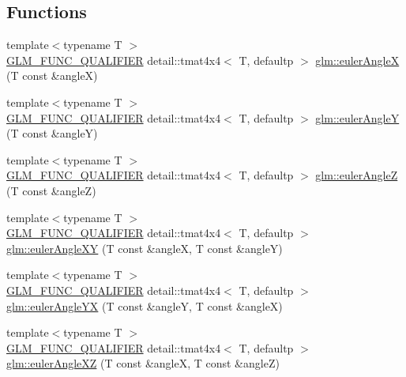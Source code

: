 \subsection*{Functions}
\begin{DoxyCompactItemize}
\item 
{\footnotesize template$<$typename T $>$ }\\\hyperlink{setup_8hpp_a33fdea6f91c5f834105f7415e2a64407}{G\+L\+M\+\_\+\+F\+U\+N\+C\+\_\+\+Q\+U\+A\+L\+I\+F\+I\+ER} detail\+::tmat4x4$<$ T, defaultp $>$ \hyperlink{group__gtx__euler__angles_ga97994e53d856ae89ed2622d66ab86c2c}{glm\+::euler\+AngleX} (T const \&angleX)
\item 
{\footnotesize template$<$typename T $>$ }\\\hyperlink{setup_8hpp_a33fdea6f91c5f834105f7415e2a64407}{G\+L\+M\+\_\+\+F\+U\+N\+C\+\_\+\+Q\+U\+A\+L\+I\+F\+I\+ER} detail\+::tmat4x4$<$ T, defaultp $>$ \hyperlink{group__gtx__euler__angles_gacdc188a23a928d57d4490ff7d646fb96}{glm\+::euler\+AngleY} (T const \&angleY)
\item 
{\footnotesize template$<$typename T $>$ }\\\hyperlink{setup_8hpp_a33fdea6f91c5f834105f7415e2a64407}{G\+L\+M\+\_\+\+F\+U\+N\+C\+\_\+\+Q\+U\+A\+L\+I\+F\+I\+ER} detail\+::tmat4x4$<$ T, defaultp $>$ \hyperlink{group__gtx__euler__angles_gaf55b28c29ebd7ba728f1ad6490c89687}{glm\+::euler\+AngleZ} (T const \&angleZ)
\item 
{\footnotesize template$<$typename T $>$ }\\\hyperlink{setup_8hpp_a33fdea6f91c5f834105f7415e2a64407}{G\+L\+M\+\_\+\+F\+U\+N\+C\+\_\+\+Q\+U\+A\+L\+I\+F\+I\+ER} detail\+::tmat4x4$<$ T, defaultp $>$ \hyperlink{group__gtx__euler__angles_ga83a52d36fd752c92ce189197b51ea785}{glm\+::euler\+Angle\+XY} (T const \&angleX, T const \&angleY)
\item 
{\footnotesize template$<$typename T $>$ }\\\hyperlink{setup_8hpp_a33fdea6f91c5f834105f7415e2a64407}{G\+L\+M\+\_\+\+F\+U\+N\+C\+\_\+\+Q\+U\+A\+L\+I\+F\+I\+ER} detail\+::tmat4x4$<$ T, defaultp $>$ \hyperlink{group__gtx__euler__angles_ga7599a8aaf3bf33b15517dd522a6d8020}{glm\+::euler\+Angle\+YX} (T const \&angleY, T const \&angleX)
\item 
{\footnotesize template$<$typename T $>$ }\\\hyperlink{setup_8hpp_a33fdea6f91c5f834105f7415e2a64407}{G\+L\+M\+\_\+\+F\+U\+N\+C\+\_\+\+Q\+U\+A\+L\+I\+F\+I\+ER} detail\+::tmat4x4$<$ T, defaultp $>$ \hyperlink{group__gtx__euler__angles_ga61110cb520fbf21dd541cf4e25d81a65}{glm\+::euler\+Angle\+XZ} (T const \&angleX, T const \&angleZ)

\end{DoxyCompactItemize}
